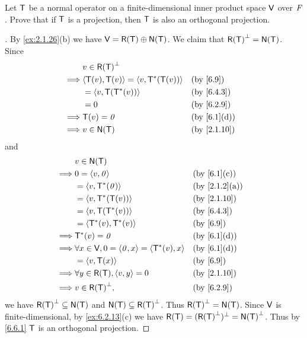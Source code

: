 \begin{ex}\label{ex:6.6.6}
  Let \(\mathsf{T}\) be a normal operator on a finite-dimensional inner product space \(\mathsf{V}\) over \(\mathit{F}\).
  Prove that if \(\mathsf{T}\) is a projection, then \(\mathsf{T}\) is also an orthogonal projection.
\end{ex}

\begin{proof}[]
  By \cref{ex:2.1.26}(b) we have \(\V = \rg{\T} \oplus \ns{\T}\).
  We claim that \(\rg{\T}^{\perp} = \ns{\T}\).
  Since
  \begin{align*}
             & v \in \rg{\T}^{\perp}                                      \\
    \implies & \inn{\T(v), \T(v)} = \inn{v, \T^*(\T(v))} &  & \by{6.9}    \\
             & = \inn{v, \T(\T^*(v))}                    &  & \by{6.4.3}  \\
             & = 0                                       &  & \by{6.2.9}  \\
    \implies & \T(v) = \zv                               &  & \by{6.1}[d] \\
    \implies & v \in \ns{\T}                             &  & \by{2.1.10}
  \end{align*}
  and
  \begin{align*}
             & v \in \ns{\T}                                                            \\
    \implies & 0 = \inn{v, \zv}                                      &  & \by{6.1}[c]   \\
             & = \inn{v, \T^*(\zv)}                                  &  & \by{2.1.2}[a] \\
             & = \inn{v, \T^*(\T(v))}                                &  & \by{2.1.10}   \\
             & = \inn{v, \T(\T^*(v))}                                &  & \by{6.4.3}    \\
             & = \inn{\T^*(v), \T^*(v)}                              &  & \by{6.9}      \\
    \implies & \T^*(v) = \zv                                         &  & \by{6.1}[d]   \\
    \implies & \forall x \in \V, 0 = \inn{\zv, x} = \inn{\T^*(v), x} &  & \by{6.1}[d]   \\
             & = \inn{v, \T(x)}                                      &  & \by{6.9}      \\
    \implies & \forall y \in \rg{\T}, \inn{v, y} = 0                 &  & \by{2.1.10}   \\
    \implies & v \in \rg{\T}^{\perp},                                &  & \by{6.2.9}
  \end{align*}
  we have \(\rg{\T}^{\perp} \subseteq \ns{\T}\) and \(\ns{\T} \subseteq \rg{\T}^{\perp}\).
  Thus \(\rg{\T}^{\perp} = \ns{\T}\).
  Since \(\mathsf{V}\) is finite-dimensional, by \cref{ex:6.2.13}(c) we have \(\rg{\T} = (\rg{\T}^{\perp})^{\perp} = \ns{\T}^{\perp}\).
  Thus by \cref{6.6.1} \(\mathsf{T}\) is an orthogonal projection.
\end{proof}

